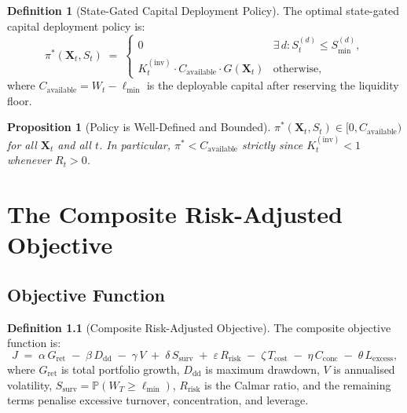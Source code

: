 \documentclass[12pt,openany]{book}
\newcommand{\Prob}{\mathbb{P}}
\numberwithin{equation}{chapter}
\theoremstyle{plain}
\newtheorem{proposition}[theorem]{Proposition}
\theoremstyle{definition}
\newtheorem{definition}[theorem]{Definition}
\theoremstyle{remark}
\def\mathcal#1{#1}%
\begin{document}
\begin{definition}[State-Gated Capital Deployment Policy]
\label{def:deployment-policy}
The optimal state-gated capital deployment policy is:
\begin{equation}
  \pi^*(\mathbf{X}_t, S_t) \;=\;
  \begin{cases}
    0
      & \exists\,d : \mathcal{S}_t^{(d)} \leq \mathcal{S}_{\min}^{(d)}, \\[6pt]
    K_t^{(\mathrm{inv})} \cdot C_{\mathrm{available}} \cdot G(\mathbf{X}_t)
      & \text{otherwise},
  \end{cases}
  \label{eq:deployment-policy}
\end{equation}
where $C_{\mathrm{available}} = W_t - \ell_{\min}$ is the
deployable capital after reserving the liquidity floor.
\end{definition}

\begin{proposition}[Policy is Well-Defined and Bounded]
\label{prop:policy-bounded}
$\pi^*(\mathbf{X}_t, S_t) \in [0, C_{\mathrm{available}})$
for all $\mathbf{X}_t$ and all $t$.  In particular,
$\pi^* < C_{\mathrm{available}}$ strictly since
$K_t^{(\mathrm{inv})} < 1$ whenever $R_t > 0$.
\end{proposition}

\chapter{The Composite Risk-Adjusted Objective}
\label{ch:objective}

\section{Objective Function}

\begin{definition}[Composite Risk-Adjusted Objective]
\label{def:objective}
The composite objective function is:
\begin{equation}
  J \;=\; \alpha\,G_{\mathrm{ret}}
         \;-\; \beta\,D_{\mathrm{dd}}
         \;-\; \gamma\,V
         \;+\; \delta\,S_{\mathrm{surv}}
         \;+\; \varepsilon\,R_{\mathrm{risk}}
         \;-\; \zeta\,T_{\mathrm{cost}}
         \;-\; \eta\,C_{\mathrm{conc}}
         \;-\; \theta\,L_{\mathrm{excess}},
  \label{eq:composite-objective}
\end{equation}
where $G_{\mathrm{ret}}$ is total portfolio growth, $D_{\mathrm{dd}}$
is maximum drawdown, $V$ is annualised volatility,
$S_{\mathrm{surv}} = \Prob(W_T \geq \ell_{\min})$,
$R_{\mathrm{risk}}$ is the Calmar ratio, and the remaining terms
penalise excessive turnover, concentration, and leverage.
\end{definition}
\end{document}
